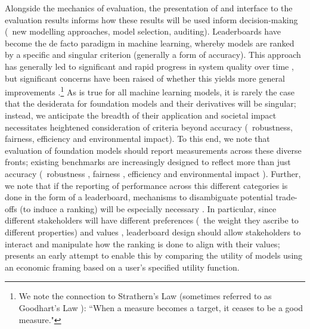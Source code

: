 Alongside the mechanics of evaluation, the presentation of and interface to the evaluation results informs how these results will be used inform decision-making (\eg~new modelling approaches, model selection, auditing). 
Leaderboards have become the de facto paradigm in machine learning, whereby models are ranked by a specific and singular criterion (generally a form of accuracy).
This approach has generally led to significant and rapid progress in system quality over time \citep[\eg][]{wang2019superglue}, but significant concerns have been raised of whether this yields more general improvements \citep[\eg][]{linzen2020, bowman2021}.\footnote{We note the connection to Strathern's Law \citep{strathern1997} (sometimes referred to as Goodhart's Law \citep{goodhart1984}): ``When a measure becomes a target, it ceases to be a good measure."}
As is true for all machine learning models, it is rarely the case that the desiderata for foundation models and their derivatives will be singular; instead, we anticipate the breadth of their application and societal impact necessitates heightened consideration of criteria beyond accuracy (\eg~robustness, fairness, efficiency and environmental impact).
To this end, we note that evaluation of foundation models should report measurements across these diverse fronts; existing benchmarks are increasingly designed to reflect more than just accuracy (\eg~robustness \citep{koh2021wilds, goel2021robustnessgym}, fairness \citep{stereoset, nangia2020}, efficiency and environmental impact \citep{coleman2017dawnbench}).
Further, we note that if the reporting of performance across this different categories is done in the form of a leaderboard, mechanisms to disambiguate potential trade-offs (to induce a ranking) will be especially necessary \citep{ethayarajh2020}.
In particular, since different stakeholders will have different preferences (\eg~the weight they ascribe to different properties) and values \citep{birhane2020}, leaderboard design should allow stakeholders to interact and manipulate how the ranking is done to align with their values; \citet{ma2021} presents an early attempt to enable this by comparing the utility of models using an economic framing based on a user's specified utility function. 

